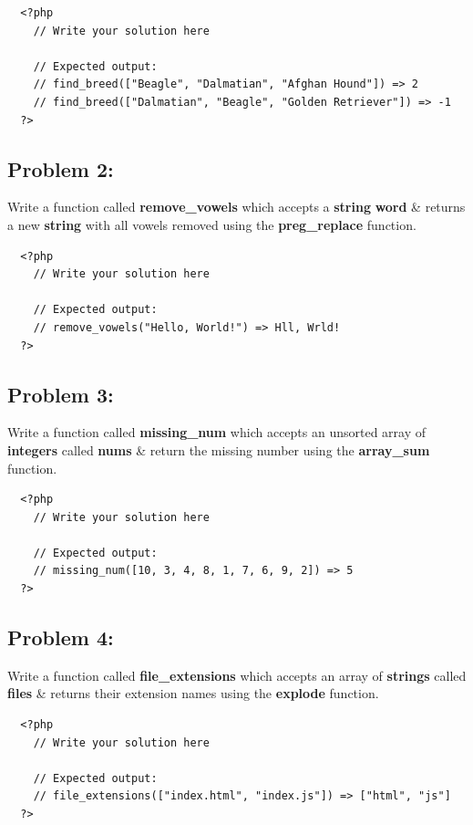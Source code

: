 \documentclass{article}
\begin{document}
\begin{verbatim}
  <?php
    // Write your solution here

    // Expected output:
    // find_breed(["Beagle", "Dalmatian", "Afghan Hound"]) => 2
    // find_breed(["Dalmatian", "Beagle", "Golden Retriever"]) => -1
  ?>
\end{verbatim}

\subsection*{Problem 2:} 
Write a function called \textbf{remove\_vowels} which accepts a \textbf{string} \textbf{word} \& returns a new \textbf{string} with all vowels removed using the \textbf{preg\_replace} function.

\begin{verbatim}
  <?php
    // Write your solution here

    // Expected output:
    // remove_vowels("Hello, World!") => Hll, Wrld!
  ?>
\end{verbatim}

\subsection*{Problem 3:} 
Write a function called \textbf{missing\_num} which accepts an unsorted array of \textbf{integers} called \textbf{nums} \& return the missing number using the \textbf{array\_sum} function.

\begin{verbatim}
  <?php
    // Write your solution here

    // Expected output:
    // missing_num([10, 3, 4, 8, 1, 7, 6, 9, 2]) => 5
  ?>
\end{verbatim}

\subsection*{Problem 4:}
Write a function called \textbf{file\_extensions} which accepts an array of \textbf{strings} called \textbf{files} \& returns their extension names using the \textbf{explode} function.

\begin{verbatim}
  <?php
    // Write your solution here

    // Expected output:
    // file_extensions(["index.html", "index.js"]) => ["html", "js"]
  ?>
\end{verbatim}
\end{document}
